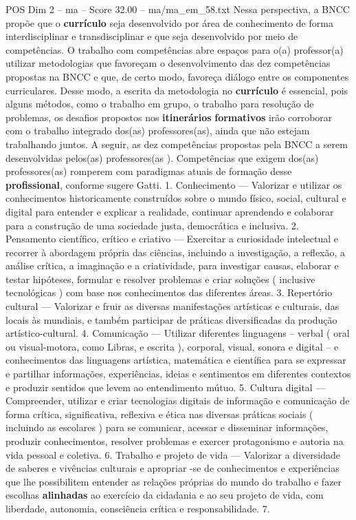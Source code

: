 \begin{textsample}{POS Dim 2 – ma – Score 32.00 – ma/ma\_em\_58.txt}
Nessa perspectiva, a BNCC propõe que o \textbf{currículo} seja desenvolvido por área de conhecimento de forma interdisciplinar e transdisciplinar e que seja desenvolvido por meio de competências.
O trabalho com competências abre espaços para o(a) professor(a) utilizar metodologias que favoreçam o desenvolvimento das dez competências propostas na BNCC e que, de certo modo, favoreça diálogo entre os componentes curriculares.
Desse modo, a escrita da metodologia no \textbf{currículo} é essencial, pois alguns métodos, como o trabalho em grupo, o trabalho para resolução de problemas, os desafios propostos nos \textbf{itinerários} \textbf{formativos} irão corroborar com o trabalho integrado dos(as) professores(as), ainda que não estejam trabalhando juntos.
A seguir, as dez competências propostas pela BNCC a serem desenvolvidas pelos(as) professores(as ).
Competências que exigem dos(as) professores(as) romperem com paradigmas atuais de formação desse \textbf{profissional}, conforme sugere Gatti. 1.
Conhecimento — Valorizar e utilizar os conhecimentos historicamente construídos sobre o mundo físico, social, cultural e digital para entender e explicar a realidade, continuar aprendendo e colaborar para a construção de uma sociedade justa, democrática e inclusiva. 2.
Pensamento científico, crítico e criativo — Exercitar a curiosidade intelectual e recorrer à abordagem própria das ciências, incluindo a investigação, a reflexão, a análise crítica, a imaginação e a criatividade, para investigar causas, elaborar e testar hipóteses, formular e resolver problemas e criar soluções ( inclusive tecnológicas ) com base nos conhecimentos das diferentes áreas. 3.
Repertório cultural — Valorizar e fruir as diversas manifestações artísticas e culturais, das locais às mundiais, e também participar de práticas diversificadas da produção artístico-cultural. 4.
Comunicação — Utilizar diferentes linguagens – verbal ( oral ou visual-motora, como Libras, e escrita ), corporal, visual, sonora e digital – e conhecimentos das linguagens artística, matemática e científica para se expressar e partilhar informações, experiências, ideias e sentimentos em diferentes contextos e produzir sentidos que levem ao entendimento mútuo. 5.
Cultura digital — Compreender, utilizar e criar tecnologias digitais de informação e comunicação de forma crítica, significativa, reflexiva e ética nas diversas práticas sociais ( incluindo as escolares ) para se comunicar, acessar e disseminar informações, produzir conhecimentos, resolver problemas e exercer protagonismo e autoria na vida pessoal e coletiva. 6.
Trabalho e projeto de vida — Valorizar a diversidade de saberes e vivências culturais e apropriar -se de conhecimentos e experiências que lhe possibilitem entender as relações próprias do mundo do trabalho e fazer escolhas \textbf{alinhadas} ao exercício da cidadania e ao seu projeto de vida, com liberdade, autonomia, consciência crítica e responsabilidade. 7.

\end{textsample}
